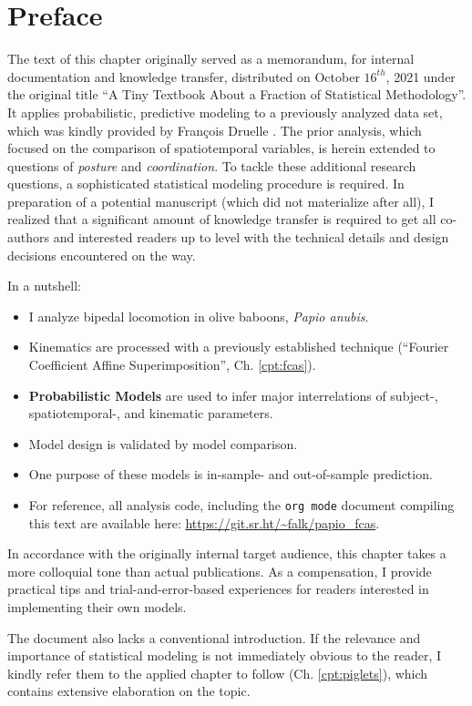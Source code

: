 
\clearpage

\section{Preface}
\label{sec:orgcfa10a1}
The text of this chapter originally served as a memorandum, for internal documentation and knowledge transfer, distributed on October \(16^{th}\), 2021 under the original title ``A Tiny Textbook About a Fraction of Statistical Methodology''.
It applies probabilistic, predictive modeling to a previously analyzed data set, which was kindly provided by François Druelle \citep[][]{Druelle2021}.
The prior analysis, which focused on the comparison of spatiotemporal variables, is herein extended to questions of \emph{posture} and \emph{coordination}.
To tackle these additional research questions, a sophisticated statistical modeling procedure is required.
In preparation of a potential manuscript (which did not materialize after all), I realized that a significant amount of knowledge transfer is required to get all co-authors and interested readers up to level with the technical details and design decisions encountered on the way.


In a nutshell:
\begin{itemize}
\item I analyze bipedal locomotion in olive baboons, \emph{Papio anubis}.
\item Kinematics are processed with a previously established technique (``Fourier Coefficient Affine Superimposition'', Ch. \ref{cpt:fcas}).
\item \textbf{Probabilistic Models} are used to infer major interrelations of subject-, spatiotemporal-, and kinematic parameters.
\item Model design is validated by model comparison.
\item One purpose of these models is in-sample- and out-of-sample prediction.
\item For reference, all analysis code, including the \texttt{org mode} document compiling this text are available here: \url{https://git.sr.ht/\~falk/papio\_fcas}.
\end{itemize}

In accordance with the originally internal target audience, this chapter takes a more colloquial tone than actual publications.
As a compensation, I provide practical tips and trial-and-error-based experiences for readers interested in implementing their own models.

The document also lacks a conventional introduction.
If the relevance and importance of statistical modeling is not immediately obvious to the reader, I kindly refer them to the applied chapter to follow (Ch. \ref{cpt:piglets}), which contains extensive elaboration on the topic.


